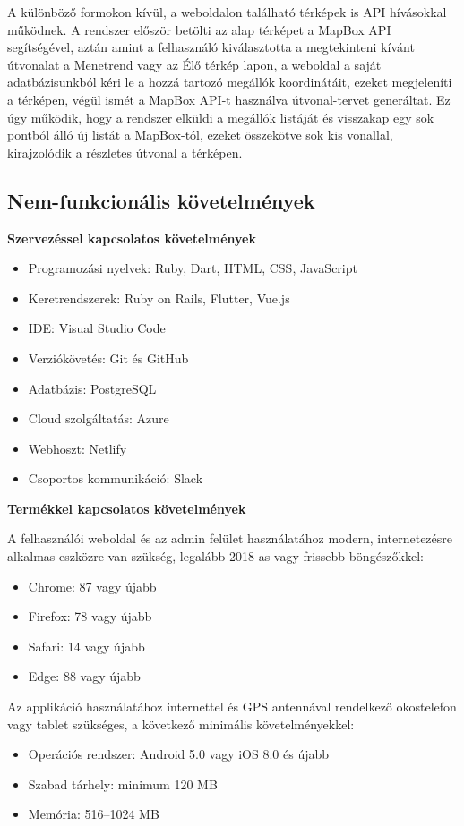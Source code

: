 A különböző formokon kívül, a weboldalon található térképek is API hívásokkal működnek. A rendszer először betölti az alap térképet a MapBox API segítségével, aztán amint a felhasználó kiválasztotta a megtekinteni kívánt útvonalat a Menetrend vagy az Élő térkép lapon, a weboldal a saját adatbázisunkból kéri le a hozzá tartozó megállók koordinátáit, ezeket megjeleníti a térképen, végül ismét a MapBox API-t használva útvonal-tervet generáltat. Ez úgy működik, hogy a rendszer elküldi a megállók listáját és visszakap egy sok pontból álló új listát a MapBox-tól, ezeket összekötve sok kis vonallal, kirajzolódik a részletes útvonal a térképen.

\subsection{Nem-funkcionális követelmények}

\textbf{Szervezéssel kapcsolatos követelmények}
\begin{itemize}
    \item Programozási nyelvek: Ruby, Dart, HTML, CSS, JavaScript
    \item Keretrendszerek: Ruby on Rails, Flutter, Vue.js
    \item IDE: Visual Studio Code
    \item Verziókövetés: Git és GitHub
    \item Adatbázis: PostgreSQL
    \item Cloud szolgáltatás: Azure
    \item Webhoszt: Netlify
    \item Csoportos kommunikáció: Slack
\end{itemize}

\textbf{Termékkel kapcsolatos követelmények}

A felhasználói weboldal és az admin felület használatához modern, internetezésre alkalmas eszközre van szükség, legalább 2018-as vagy frissebb böngészőkkel:
\begin{itemize}
    \item Chrome: 87 vagy újabb
    \item Firefox: 78 vagy újabb
    \item Safari: 14 vagy újabb
    \item Edge: 88 vagy újabb
\end{itemize}

Az applikáció használatához internettel és GPS antennával rendelkező okostelefon vagy tablet szükséges, a következő minimális követelményekkel:
\begin{itemize}
    \item Operációs rendszer: Android 5.0 vagy iOS 8.0 és újabb
    \item Szabad tárhely: minimum 120 MB
    \item Memória: 516–1024 MB
\end{itemize}

